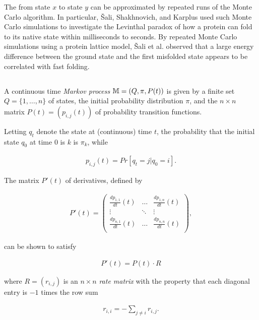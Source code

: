 The \mfpt from state $x$ to state $y$ can
be approximated by repeated runs of the Monte Carlo algorithm.
In particular, \v{S}ali, Shakhnovich, and Karplus used such Monte Carlo
simulations to investigate the Levinthal paradox of how a protein
can fold to its native state within milliseconds to seconds.
By repeated Monte Carlo simulations using a protein lattice model,
\v{S}ali et al. observed that a large energy difference between
the ground state
and the first misfolded state appears to be correlated with fast folding.

\subsection{\Eqt}
\label{subsec:hermes:eq}

A continuous time {\em Markov process} $\mathbb{M}=(Q,\pi,P(t))$
is given by a finite set $Q= \{1,\dots,n\}$ of states, the
initial probability distribution $\pi$,
and the $n\times n$ matrix $P(t)=(p_{i,j}(t))$ of
probability transition functions.

Letting $q_t$ denote the state at (continuous)
time $t$, the probability that the initial state $q_0$ at time 0 is
$k$ is $\pi_k$, while

\begin{align}
\label{eq:hermes:markovProcess}
p_{i,j}(t) = Pr[q_{t} = j| q_0 = i].
\end{align}

The matrix $P'(t)$ of derivatives, defined by

\begin{align}
  P'(t) = \left(
\begin{array}{ccc}
\frac{d p_{1,1}}{d t}(t) & \dots  & \frac{d p_{1,n}}{d t}(t)\\
\vdots & \ddots & \vdots \\
 \frac{d p_{n,1}}{d t}(t) & \dots  & \frac{d p_{n,n}}{d t}(t)\\
\end{array}
\right),
\end{align}

can be shown to satisfy

\begin{align}
P'(t) = P(t) \cdot R
\end{align}

where $R = (r_{i,j})$ is an $n \times n$ {\em rate matrix} with the
property that each diagonal entry is $-1$ times the row sum

\begin{align}
r_{i,i} = - \sum_{j\ne i} r_{i,j}.
\end{align}

